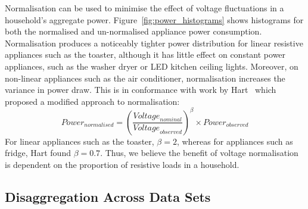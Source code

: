 \documentclass{sig-alternate}
\newcommand{\bluecolor}[1]{\textcolor{blue}{#1}}
\begin{document}
\noindent
Normalisation can be used to minimise the effect of voltage fluctuations in a household's aggregate power. 
Figure~\ref{fig:power_histograms} shows
histograms for both the normalised and un-normalised appliance power
consumption. Normalisation produces a noticeably tighter power
distribution for linear resistive appliances such as the toaster, although it has
little effect on constant power appliances, such as the washer dryer or LED kitchen ceiling lights. Moreover, on non-linear appliances such as the air conditioner, normalisation increases the variance in power draw. This is in conformance with work by Hart~\cite{hart_1992} which proposed a modified approach to normalisation:
\begin{equation}
\textit{Power}_{\textit{normalised}} = 
\left(\frac{\textit{Voltage}_{\textit{nominal}}}{\textit{Voltage}_{\textit{observed}}}\right)^\beta
\times \textit{Power}_{\textit{observed}}
\end{equation}
For linear appliances such as the toaster, $\beta=2$, whereas for appliances such as fridge, Hart found $\beta=0.7$. Thus, we believe the benefit of voltage normalisation is dependent on the proportion of resistive loads in a household. %

\subsection{Disaggregation Across Data Sets}
\end{document}

